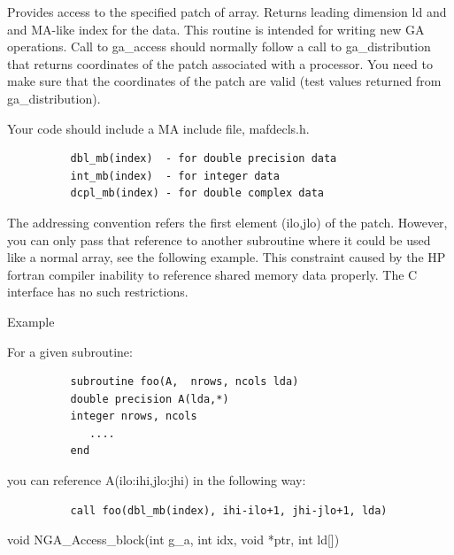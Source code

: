 \documentclass[12pt]{article}
\begin{document}
\begin{fdesc}

Provides access to the specified patch of array. Returns leading dimension ld
and and MA-like index for the data. This routine is intended for writing new GA
operations. Call to ga_access should normally follow a call to ga_distribution
that returns coordinates of the patch associated with a processor. You need to
make sure that the coordinates of the patch are valid (test values returned
from ga_distribution).

Your code should include a MA include file, mafdecls.h.
\begin{verbatim}
          dbl_mb(index)  - for double precision data
          int_mb(index)  - for integer data
          dcpl_mb(index) - for double complex data
\end{verbatim}

The addressing convention refers the first element (ilo,jlo) of the patch.
However, you can only pass that reference to another subroutine where it could
be used like a normal array, see the following example. This constraint caused
by the HP fortran compiler inability to reference shared memory data properly.
The C interface has no such restrictions.

Example

For a given subroutine:
\begin{verbatim}
          subroutine foo(A,  nrows, ncols lda)
          double precision A(lda,*)
          integer nrows, ncols
             ....
          end
\end{verbatim}
you can reference A(ilo:ihi,jlo:jhi) in the following way:

\begin{verbatim}
          call foo(dbl_mb(index), ihi-ilo+1, jhi-jlo+1, lda)
\end{verbatim}

\end{fdesc}


\begin{capi}
\begin{ccode}
void NGA_Access_block(int g_a, int idx, void *ptr, int ld[])
\end{ccode}
\begin{funcargs}
\end{funcargs}
\end{capi}
\end{document}
